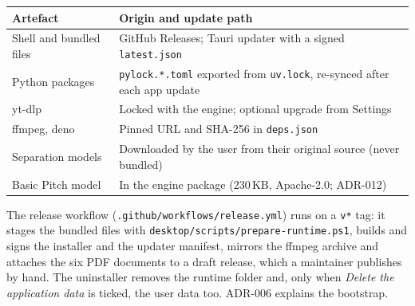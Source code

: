 \begin{tabularx}{\linewidth}{@{}lY@{}}
\toprule
\textbf{Artefact} & \textbf{Origin and update path} \\
\midrule
Shell and bundled files & GitHub Releases; Tauri updater with a signed
\texttt{latest.json} \\
Python packages & \texttt{pylock.*.toml} exported from \texttt{uv.lock},
re-synced after each app update \\
yt-dlp & Locked with the engine; optional upgrade from Settings \\
ffmpeg, deno & Pinned URL and SHA-256 in \texttt{deps.json} \\
Separation models & Downloaded by the user from their original source (never bundled) \\
Basic Pitch model & In the engine package (230\,KB, Apache-2.0; ADR-012) \\
\bottomrule
\end{tabularx}

The release workflow (\texttt{.github/workflows/release.yml}) runs on a
\texttt{v*} tag: it stages the bundled files with
\texttt{desktop/scripts/prepare-runtime.ps1}, builds and signs the installer
and the updater manifest, mirrors the ffmpeg archive and attaches the six PDF
documents to a draft release, which a maintainer publishes by hand. The
uninstaller removes the runtime folder and, only when \emph{Delete the
application data} is ticked, the user data too. ADR-006 explains the bootstrap.

